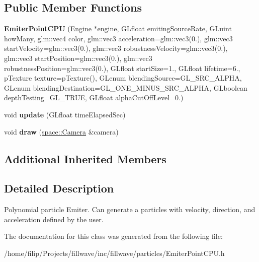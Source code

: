 \subsection*{Public Member Functions}
\begin{DoxyCompactItemize}
\item 
\hypertarget{classfillwave_1_1particles_1_1EmiterPointCPU_a6aab1f8b79a2644cfc41b1c9b8c20a2e}{}{\bfseries Emiter\+Point\+C\+P\+U} (\hyperlink{classfillwave_1_1Engine}{Engine} $\ast$engine, G\+Lfloat emiting\+Source\+Rate, G\+Luint how\+Many, glm\+::vec4 color, glm\+::vec3 acceleration=glm\+::vec3(0.), glm\+::vec3 start\+Velocity=glm\+::vec3(0.), glm\+::vec3 robustness\+Velocity=glm\+::vec3(0.), glm\+::vec3 start\+Position=glm\+::vec3(0.), glm\+::vec3 robustness\+Position=glm\+::vec3(0.), G\+Lfloat start\+Size=1., G\+Lfloat lifetime=6., p\+Texture texture=p\+Texture(), G\+Lenum blending\+Source=G\+L\+\_\+\+S\+R\+C\+\_\+\+A\+L\+P\+H\+A, G\+Lenum blending\+Destination=G\+L\+\_\+\+O\+N\+E\+\_\+\+M\+I\+N\+U\+S\+\_\+\+S\+R\+C\+\_\+\+A\+L\+P\+H\+A, G\+Lboolean depth\+Testing=G\+L\+\_\+\+T\+R\+U\+E, G\+Lfloat alpha\+Cut\+Off\+Level=0.)\label{classfillwave_1_1particles_1_1EmiterPointCPU_a6aab1f8b79a2644cfc41b1c9b8c20a2e}

\item 
\hypertarget{classfillwave_1_1particles_1_1EmiterPointCPU_a7f3440a25739cee2c3524f18f4b97e9c}{}void {\bfseries update} (G\+Lfloat time\+Elapsed\+Sec)\label{classfillwave_1_1particles_1_1EmiterPointCPU_a7f3440a25739cee2c3524f18f4b97e9c}

\item 
\hypertarget{classfillwave_1_1particles_1_1EmiterPointCPU_ad752356f2a1e1ae49a273c9eba049edf}{}void {\bfseries draw} (\hyperlink{classfillwave_1_1space_1_1Camera}{space\+::\+Camera} \&camera)\label{classfillwave_1_1particles_1_1EmiterPointCPU_ad752356f2a1e1ae49a273c9eba049edf}

\end{DoxyCompactItemize}
\subsection*{Additional Inherited Members}


\subsection{Detailed Description}
Polynomial particle Emiter. Can generate a particles with velocity, direction, and acceleration defined by the user. 

The documentation for this class was generated from the following file\+:\begin{DoxyCompactItemize}
\item 
/home/filip/\+Projects/fillwave/inc/fillwave/particles/Emiter\+Point\+C\+P\+U.\+h\end{DoxyCompactItemize}
